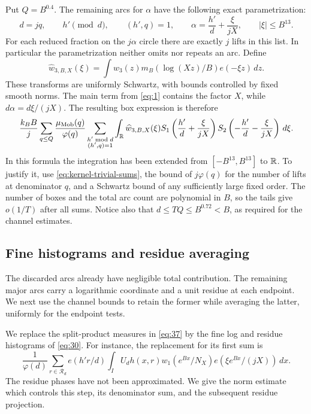 Put \(Q=B^{0.4}\).  The remaining arcs for \(\alpha\) have the
following exact parametrization:
\[
 d=jq,\qquad h'\pmod d,\qquad (h',q)=1,\qquad
 \alpha=\frac{h'}d+\frac{\xi}{jX},\qquad |\xi|\le B^{13}.
\]
For each reduced fraction on the \(j\alpha\) circle there are exactly
\(j\) lifts in this list.  In particular the parametrization neither
omits nor repeats an arc.  Define
\[
 \widehat w_{3,B,X}(\xi)
 =\int w_3(z)m_B(\log(Xz)/B)e(-\xi z)\,dz.
\]
These transforms are uniformly Schwartz, with bounds controlled by
fixed smooth norms.  The main term from \eqref{eq:1} contains the
factor \(X\), while \(d\alpha=d\xi/(jX)\).  The resulting box
expression is therefore
\begin{equation}\label{eq:37}
 \frac{k_BB}{j}
 \sum_{q\le Q}\frac{\mu_{\rm Mob}(q)}{\varphi(q)}
 \sum_{\substack{h'\bmod d\\(h',q)=1}}
 \int_\mathbb R\widehat w_{3,B,X}(\xi)
 S_1\left(\frac{h'}d+\frac{\xi}{jX}\right)
 S_2\left(-\frac{h'}d-\frac{\xi}{jX}\right)\,d\xi.
\end{equation}
In this formula the integration has been extended from
\([-B^{13},B^{13}]\) to \(\mathbb R\).  To justify it, use
\eqref{eq:kernel-trivial-sums}, the bound of \(j\varphi(q)\) for the
number of lifts at denominator \(q\), and a Schwartz bound of any
sufficiently large fixed order.  The number of boxes and the total
arc count are polynomial in \(B\), so the tails give \(o(1/T)\) after
all sums.  Notice also that \(d\le TQ\le B^{0.72}<B\), as required
for the channel estimates.

\subsection{Fine histograms and residue averaging}

The discarded arcs already have negligible total contribution. The
remaining major arcs carry a logarithmic coordinate and a unit residue at
each endpoint. We next use the channel bounds to retain the former while
averaging the latter, uniformly for the endpoint tests.

We replace the split-product measures in \eqref{eq:37} by the
fine log and residue histograms of \eqref{eq:30}.  For instance, the
replacement for its first sum is
\begin{equation}\label{eq:38}
 \frac1{\varphi(d)}\sum_{r\in\mathcal R_d}e(h'r/d)
 \int_I U_dh(x,r)w_1(e^{Bx}/N_X)
                   e(\xi e^{Bx}/(jX))\,dx.
\end{equation}
The residue phases have not been approximated.  We give the norm
estimate which controls this step, its denominator sum, and the
subsequent residue projection.

